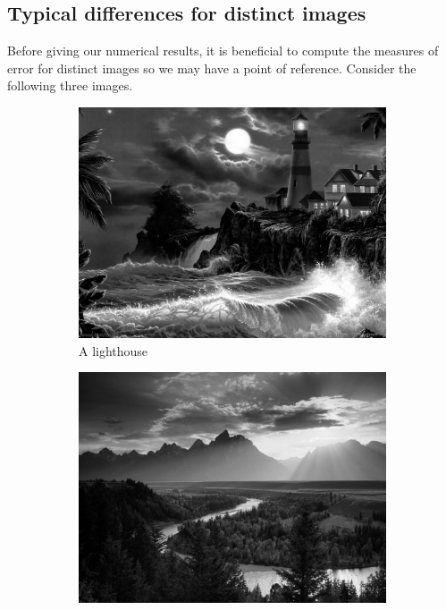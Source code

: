 \documentclass[12pt]{amsart}
\theoremstyle{definition}
\theoremstyle{remark}
\numberwithin{thm}{section}
\begin{document}
\subsection{Typical differences for distinct images}\label{section: typical differences}
Before giving our numerical results, it is beneficial to compute the measures of error for distinct images so we may have a point of reference. Consider the following three images.
\begin{figure}[h] \centering
\begin{subfigure}[t]{0.3\textwidth}
\includegraphics[scale=.13]{lighthouse_gray.jpg}
\caption{A lighthouse}\label{lighthouse}
\end{subfigure}
\begin{subfigure}[t]{0.3\textwidth}
\includegraphics[scale=.13]{sunset_gray.jpg}

\end{subfigure}
\end{figure}
\end{document}
